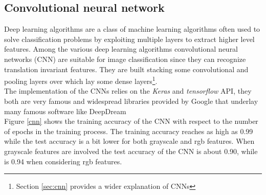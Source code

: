 \documentclass{article}
\begin{document}
\subsection{Convolutional neural network}
Deep learning algorithms are a class of machine learning algorithms often used to solve classification problems by exploiting multiple layers to extract higher level features. Among the various deep learning algorithms convolutional neural networks (CNN) are suitable for image classification since they can recognize translation invariant features. They are built stacking some convolutional and pooling layers over which lay some dense layers\footnote{Section \ref{sec:cnn} provides a wider explanation of CNNs}. \\
The implementation of the CNNs relies on the \textit{Keras} and \textit{tensorflow} API, they both are very famous and widespread libraries provided by Google that underlay many famous software like DeepDream\\
Figure \ref{cnn} shows the training accuracy of the CNN with respect to the number of epochs in the training process. The training accuracy reaches as high as 0.99 while the test accuracy is a bit lower for both grayscale and rgb features.
When grayscale features are involved the test accuracy of the CNN is about 0.90, while is 0.94 when considering rgb features.
\end{document}
